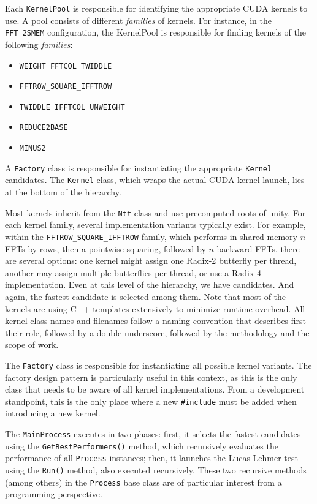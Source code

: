 \documentclass{article}
\begin{document}
Each \texttt{KernelPool} is responsible for identifying the appropriate CUDA kernels to use. A pool consists of different \emph{families} of kernels. For instance, in the \texttt{FFT\_2SMEM} configuration, the KernelPool is responsible for finding kernels of the following \emph{families}:
\begin{itemize}
    \item \texttt{WEIGHT\_FFTCOL\_TWIDDLE}
    \item \texttt{FFTROW\_SQUARE\_IFFTROW}
    \item \texttt{TWIDDLE\_IFFTCOL\_UNWEIGHT}
    \item \texttt{REDUCE2BASE}
    \item \texttt{MINUS2}
\end{itemize}
A \texttt{Factory} class is responsible for instantiating the appropriate \texttt{Kernel} candidates. The \texttt{Kernel} class, which wraps the actual CUDA kernel launch, lies at the bottom of the hierarchy. 

\newpage
Most kernels inherit from the \texttt{Ntt} class and use precomputed roots of unity. For each kernel family, several implementation variants typically exist. For example, within the \texttt{FFTROW\_SQUARE\_IFFTROW} family, which performs in shared memory $n$ FFTs by rows, then a pointwise squaring, followed by $n$ backward FFTs, there are several options: one kernel might assign one Radix-2 butterfly per thread, another may assign multiple butterflies per thread, or use a Radix-4 implementation. Even at this level of the hierarchy, we have candidates. And again, the fastest candidate is selected among them. Note that most of the kernels are using C++ templates extensively to minimize runtime overhead. All kernel class names and filenames follow a naming convention that describes first their role, followed by a double underscore, followed by the methodology and the scope of work.

The \texttt{Factory} class is responsible for instantiating all possible kernel variants. The factory design pattern is particularly useful in this context, as this is the only class that needs to be aware of all kernel implementations. From a development standpoint, this is the only place where a new \texttt{\#include} must be added when introducing a new kernel.

The \texttt{MainProcess} executes in two phases: first, it selects the fastest candidates using the \texttt{GetBestPerformers()} method, which recursively evaluates the performance of all \texttt{Process} instances; then, it launches the Lucas-Lehmer test using the \texttt{Run()} method, also executed recursively. These two recursive methods (among others) in the \texttt{Process} base class are of particular interest from a programming perspective.
\end{document}
